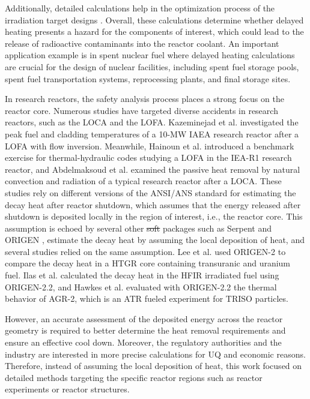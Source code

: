\documentclass{style/nseJournal}
\providecommand{\DIFadd}[1]{{\protect\color{blue}\uwave{#1}}} %
\providecommand{\DIFdel}[1]{{\protect\color{red}\sout{#1}}}                      %
\providecommand{\DIFaddbegin}{} %
\providecommand{\DIFaddend}{} %
\providecommand{\DIFdelbegin}{} %
\providecommand{\DIFdelend}{} %
\begin{document}
Additionally, detailed calculations help in the optimization process of the irradiation target designs \cite{peterson-droogh_current_2018}.
Overall, these calculations determine whether delayed heating presents a hazard for the components of interest, which could lead to the release of radioactive contaminants into the reactor coolant.
An important application example is in spent nuclear fuel where delayed heating calculations are crucial for the design of nuclear facilities, including spent fuel storage pools, spent fuel transportation systems, reprocessing plants, and final storage sites.

In research reactors, the safety analysis process places a strong focus on the reactor core.
Numerous studies have targeted diverse accidents in research reactors, such as the \gls*{LOCA} and the \gls*{LOFA}.
Kazeminejad et al. \cite{kazeminejad_thermal_2008} investigated the peak fuel and cladding temperatures of a 10-MW IAEA research reactor after a LOFA with flow inversion.
Meanwhile, Hainoun et al. \cite{hainoun_international_2014} introduced a benchmark exercise for thermal-hydraulic codes studying a LOFA in the IEA-R1 research reactor, and Abdelmaksoud et al. \cite{abdelmaksoud_analysis_2022} examined the passive heat removal by natural convection and radiation of a typical research reactor after a LOCA.
These studies rely on different versions of the ANSI/ANS standard \cite{ans_decay_1994} for estimating the decay heat after reactor shutdown, which assumes that the energy released after shutdown is deposited locally in the region of interest, i.e., the reactor core.
This assumption is echoed by several other \DIFdelbegin \DIFdel{soft }\DIFdelend \DIFaddbegin \DIFadd{software }\DIFaddend packages such as Serpent \cite{leppanen_serpent_2015, giot_decay_2018} and ORIGEN \cite{scale}, \DIFaddbegin \DIFadd{which }\DIFaddend estimate the decay heat by assuming the local deposition of heat, and several studies relied on the same assumption.
Lee et al. \cite{lee_decay_2010} used ORIGEN-2 to compare the decay heat in a \gls*{HTGR} core containing transuranic and uranium fuel.
Ilas et al. \cite{ilas_modeling_2015} calculated the decay heat in the \gls*{HFIR} irradiated fuel using ORIGEN-2.2, and Hawkes et al. \cite{hawkes_sensitivity_2015} evaluated with ORIGEN-2.2 the thermal behavior of AGR-2, which is an \gls*{ATR} fueled experiment for TRISO particles.

However, an accurate assessment of the deposited energy across the reactor geometry is required to better determine the heat removal requirements and ensure an effective cool down.
Moreover, the regulatory authorities and the industry are interested in more precise calculations for \gls*{UQ} and economic reasons.
Therefore, instead of assuming the local deposition of heat, this work focused on detailed methods targeting the specific reactor regions such as reactor experiments or reactor structures.
\end{document}
